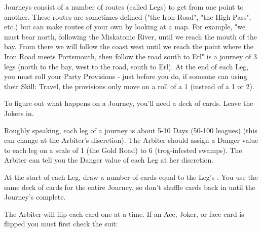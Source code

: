 

Journeys consist of a number of routes (called Legs) to get from one point to another.  These routes are sometimes defined ("the Iron Road", "the High Pass", etc.) but can make routes of your own by looking at a map.  For example, "we must bear north, following the Miskatonic River, until we reach the mouth of the bay.  From there we will follow the coast west until we reach the point where the Iron Road meets Portsmouth, then follow the road south to Erl" is a journey of 3 legs (north to the bay, west to the road, south to Erl).  At the end of each Leg, you must roll your Party Provisions \UD - just before you do, if someone can \RO using their Skill: Travel, the provisions only move \DCDOWN on a roll of a 1 (instead of a 1 or 2).

To figure out what happens on a Journey, you'll need a deck of cards.  Leave the Jokers in.


Roughly speaking, each leg of a journey is about 5-10 Days (50-100 leagues) (this can change at the Arbiter's discretion).  The Arbiter should assign a Danger value to each leg on a scale of 1 (the Gold Road) to 6 (trog-infested swamps).  The Arbiter can tell you the Danger value of each Leg at her discretion. 


At the start of each Leg, draw a number of cards equal to the Leg's . You use the same deck of cards for the entire Journey, so don't shuffle cards back in until the Journey's complete. 

\cbreak

The Arbiter will flip each card one at a time. If an Ace, Joker, or face card is flipped you must first check the suit:


